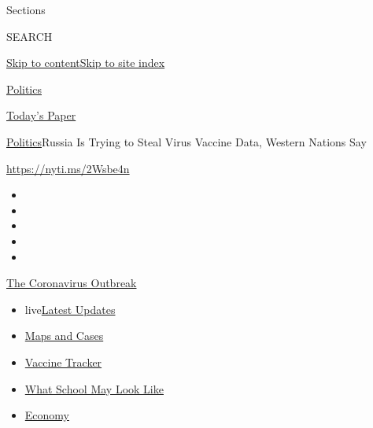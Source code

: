 Sections

SEARCH

\protect\hyperlink{site-content}{Skip to
content}\protect\hyperlink{site-index}{Skip to site index}

\href{https://www.nytimes.com/section/politics}{Politics}

\href{https://myaccount.nytimes.com/auth/login?response_type=cookie\&client_id=vi}{}

\href{https://www.nytimes.com/section/todayspaper}{Today's Paper}

\href{/section/politics}{Politics}\textbar{}Russia Is Trying to Steal
Virus Vaccine Data, Western Nations Say

\url{https://nyti.ms/2Wsbe4n}

\begin{itemize}
\item
\item
\item
\item
\item
\end{itemize}

\href{https://www.nytimes.com/news-event/coronavirus?action=click\&pgtype=Article\&state=default\&region=TOP_BANNER\&context=storylines_menu}{The
Coronavirus Outbreak}

\begin{itemize}
\tightlist
\item
  live\href{https://www.nytimes.com/2020/08/02/world/coronavirus-updates.html?action=click\&pgtype=Article\&state=default\&region=TOP_BANNER\&context=storylines_menu}{Latest
  Updates}
\item
  \href{https://www.nytimes.com/interactive/2020/us/coronavirus-us-cases.html?action=click\&pgtype=Article\&state=default\&region=TOP_BANNER\&context=storylines_menu}{Maps
  and Cases}
\item
  \href{https://www.nytimes.com/interactive/2020/science/coronavirus-vaccine-tracker.html?action=click\&pgtype=Article\&state=default\&region=TOP_BANNER\&context=storylines_menu}{Vaccine
  Tracker}
\item
  \href{https://www.nytimes.com/interactive/2020/07/29/us/schools-reopening-coronavirus.html?action=click\&pgtype=Article\&state=default\&region=TOP_BANNER\&context=storylines_menu}{What
  School May Look Like}
\item
  \href{https://www.nytimes.com/live/2020/07/31/business/stock-market-today-coronavirus?action=click\&pgtype=Article\&state=default\&region=TOP_BANNER\&context=storylines_menu}{Economy}
\end{itemize}

